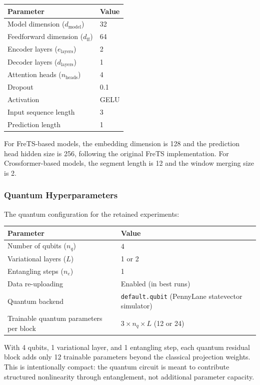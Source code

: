\documentclass[11pt]{article}
\begin{document}
\begin{center}
\begin{tabular}{ll}
\toprule
Parameter & Value \\
\midrule
Model dimension ($d_\text{model}$) & 32 \\
Feedforward dimension ($d_\text{ff}$) & 64 \\
Encoder layers ($e_\text{layers}$) & 2 \\
Decoder layers ($d_\text{layers}$) & 1 \\
Attention heads ($n_\text{heads}$) & 4 \\
Dropout & 0.1 \\
Activation & GELU \\
Input sequence length & 3 \\
Prediction length & 1 \\
\bottomrule
\end{tabular}
\end{center}

For FreTS-based models, the embedding dimension is 128 and the prediction head hidden size is 256, following the original FreTS implementation. For Crossformer-based models, the segment length is 12 and the window merging size is 2.

\subsubsection*{Quantum Hyperparameters}

The quantum configuration for the retained experiments:

\begin{center}
\begin{tabular}{ll}
\toprule
Parameter & Value \\
\midrule
Number of qubits ($n_q$) & 4 \\
Variational layers ($L$) & 1 or 2 \\
Entangling steps ($n_e$) & 1 \\
Data re-uploading & Enabled (in best runs) \\
Quantum backend & \texttt{default.qubit} (PennyLane statevector simulator) \\
Trainable quantum parameters per block & $3 \times n_q \times L$ (12 or 24) \\
\bottomrule
\end{tabular}
\end{center}

With 4 qubits, 1 variational layer, and 1 entangling step, each quantum residual block adds only 12 trainable parameters beyond the classical projection weights. This is intentionally compact: the quantum circuit is meant to contribute structured nonlinearity through entanglement, not additional parameter capacity.
\end{document}
